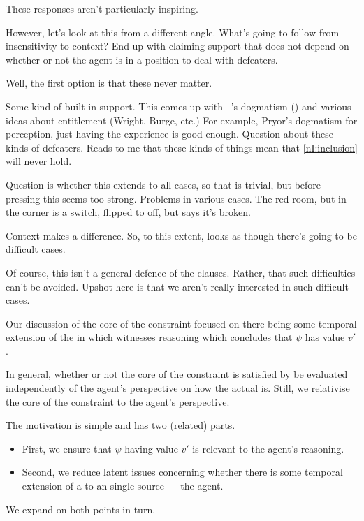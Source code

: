 \begin{note}[Uninspiring]
  These responses aren't particularly inspiring.

  However, let's look at this from a different angle.
  What's going to follow from insensitivity to context?
  End up with claiming support that does not depend on whether or not the agent is in a position to deal with defeaters.

  Well, the first option is that these never matter.

  Some kind of built in support.
  This comes up with ~\citeauthor{Pryor:2012tq}'s dogmatism (\cite{Pryor:2000tl,Pryor:2012tq}) and various ideas about entitlement (Wright, Burge, etc.)
  For example, Pryor's dogmatism for perception, just having the experience is good enough.
  Question about these kinds of defeaters.
  Reads to me that these kinds of things mean that \ref{nI:inclusion} will never hold.

  Question is whether this extends to all cases, so that \nI{} is trivial, but before pressing this seems too strong.
  Problems in various cases.
  The red room, but in the corner is a switch, flipped to off, but says it's broken.

  Context makes a difference.
  So, to this extent, looks as though there's going to be difficult cases.
\end{note}

\begin{note}
  Of course, this isn't a general defence of the clauses.
  Rather, that such difficulties can't be avoided.
  Upshot here is that we aren't really interested in such difficult cases.
\end{note}


\begin{note}
  Our discussion of the core of the constraint focused on there being some temporal extension of the \world{} in which \vAgent{} witnesses reasoning which concludes that \(\psi\) has value \(v'\).

  In general, whether or not the core of the constraint is satisfied by be evaluated independently of the agent's perspective on how the actual \world{} is.
  Still, we relativise the core of the constraint to the agent's perspective.

  The motivation is simple and has two (related) parts.
  \begin{itemize}
  \item
    First, we ensure that \(\psi\) having value \(v'\) is relevant to the agent's reasoning.
  \item
    Second, we reduce latent issues concerning whether there is some temporal extension of a \world{} to an single source --- the agent.
  \end{itemize}
  We expand on both points in turn.
\end{note}

